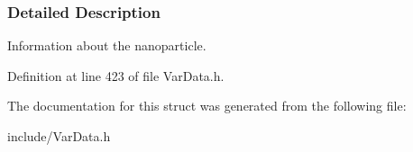 \subsubsection{\-Detailed \-Description}
\-Information about the nanoparticle. 

\-Definition at line 423 of file \-Var\-Data.\-h.



\-The documentation for this struct was generated from the following file\-:\begin{DoxyCompactItemize}
\item 
include/\-Var\-Data.\-h\end{DoxyCompactItemize}
